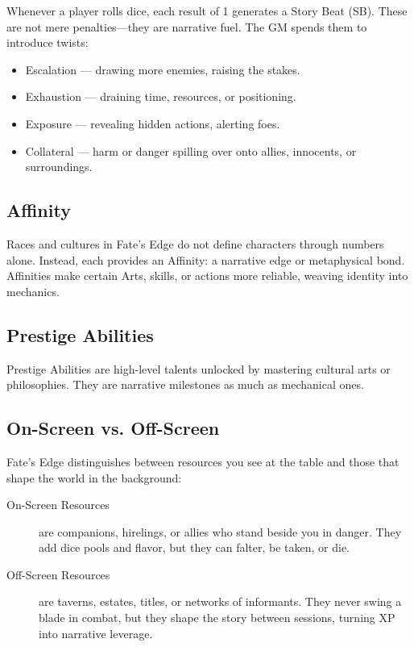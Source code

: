 Whenever a player rolls dice, each result of 1 generates a Story Beat (SB). These are not mere penalties---they are narrative fuel. The GM spends them to introduce twists:

\begin{itemize}
\item Escalation --- drawing more enemies, raising the stakes.
\item Exhaustion --- draining time, resources, or positioning.
\item Exposure --- revealing hidden actions, alerting foes.
\item Collateral --- harm or danger spilling over onto allies, innocents, or surroundings.
\end{itemize}

\subsection{Affinity}

Races and cultures in Fate's Edge do not define characters through numbers alone. Instead, each provides an Affinity: a narrative edge or metaphysical bond. Affinities make certain Arts, skills, or actions more reliable, weaving identity into mechanics.

\subsection{Prestige Abilities}

Prestige Abilities are high-level talents unlocked by mastering cultural arts or philosophies. They are narrative milestones as much as mechanical ones.

\subsection{On-Screen vs. Off-Screen}

Fate's Edge distinguishes between resources you see at the table and those that shape the world in the background:

\begin{description}
\item[On-Screen Resources] are companions, hirelings, or allies who stand beside you in danger. They add dice pools and flavor, but they can falter, be taken, or die.
\item[Off-Screen Resources] are taverns, estates, titles, or networks of informants. They never swing a blade in combat, but they shape the story between sessions, turning XP into narrative leverage.
\end{description}

